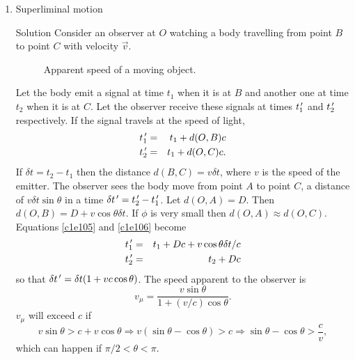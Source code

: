 \begin{enumerate}
\item Superliminal motion \cite{pg}
\item[Solution] Consider an observer at $O$ watching a body travelling from
point $B$ to point $C$ with velocity $\vec{v}$. 
\begin{figure}
\centering
{}
\caption{Apparent speed of a moving object.}
\end{figure}

Let the body emit a signal at time $t_1$ when it is at $B$ and another one at
time $t_2$ when it is at $C$. Let the observer receive these signals at times
$t_1^{\,\prime}$ and $t_2^{\,\prime}$ respectively. If the signal travels at the speed of
light,
\begin{eqnarray}
t_1^{\,\prime} &=& t_1 + d(O, B)c \label{c1e105} \\
t_2^{\,\prime} &=& t_1 + d(O, C)c. \label{c1e106}
\end{eqnarray}
If $\delta t = t_2 - t_1$ then the distance $d(B, C) = v\delta t$, where $v$
is the speed of the emitter. The observer sees the body move from point $A$
to point $C$, a distance of $v\delta t\sin\theta$ in a time $\delta t^{\,\prime} =
t_2^{\,\prime} - t_1^{\,\prime}$. Let $d(O, A)=D$. Then $d(O, B) = D + v\cos\theta\delta t$.
If $\phi$ is very small then $d(O, A) \approx d(O, C)$. Equations \eqref{c1e105}
and \eqref{c1e106} become
\begin{eqnarray}
t_1^{\,\prime} &=& t_1 + Dc + v\cos\theta\delta t/c \label{c1e107} \\
t_2^{\,\prime} &=& t_2 + Dc \label{c1e108}
\end{eqnarray}
so that $\delta t^{\,\prime} = \delta t(1  + vc\cos\theta)$. The speed apparent to
the observer is 
\begin{equation}\label{c1e109}
v_\mu = \frac{v\sin\theta}{1 + (v/c)\cos\theta}.
\end{equation}
$v_\mu$ will exceed $c$ if
\[
v\sin\theta > c + v\cos\theta \Rightarrow v(\sin\theta - \cos\theta) > c
\Rightarrow \sin\theta - \cos\theta > \frac{c}{v},
\]
which can happen if $\pi/2 < \theta < \pi$.


\end{enumerate}
